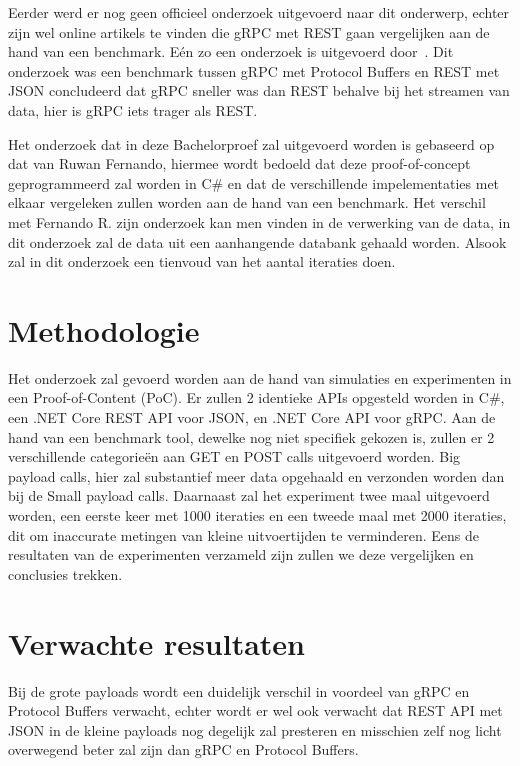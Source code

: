 Eerder werd er nog geen officieel onderzoek uitgevoerd naar dit onderwerp, echter zijn wel online artikels te vinden die gRPC met REST gaan vergelijken aan de hand van een benchmark. Eén zo een onderzoek is uitgevoerd door~\textcite{Fernando2019}. Dit onderzoek was een benchmark tussen gRPC met Protocol Buffers en REST met JSON concludeerd dat gRPC sneller was dan REST behalve bij het streamen van data, hier is gRPC iets trager als REST.

Het onderzoek dat in deze Bachelorproef zal uitgevoerd worden is gebaseerd op dat van Ruwan Fernando, hiermee wordt bedoeld dat deze proof-of-concept geprogrammeerd zal worden in C\# en dat de  verschillende impelementaties met elkaar vergeleken zullen worden aan de hand van een benchmark. Het verschil met Fernando R. zijn onderzoek kan men vinden in de verwerking van de data, in dit onderzoek zal de data uit een aanhangende databank gehaald worden. Alsook zal in dit onderzoek een tienvoud van het aantal iteraties doen.


\section{Methodologie}
\label{sec:methodologie}
Het onderzoek zal gevoerd worden aan de hand van simulaties en experimenten in een Proof-of-Content (PoC). Er zullen 2 identieke APIs opgesteld worden in C\#, een .NET Core REST API voor JSON, en .NET Core API voor gRPC. Aan de hand van een benchmark tool, dewelke nog niet specifiek gekozen is, zullen er 2 verschillende categorieën aan GET en POST calls uitgevoerd worden. Big payload calls, hier zal substantief meer data opgehaald en verzonden worden dan bij de Small payload calls. Daarnaast zal het experiment twee maal uitgevoerd worden, een eerste keer met 1000 iteraties en een tweede maal met 2000 iteraties, dit om inaccurate metingen van kleine uitvoertijden te verminderen.
Eens de resultaten van de experimenten verzameld zijn zullen we deze vergelijken en conclusies trekken.
\section{Verwachte resultaten}
\label{sec:verwachte_resultaten}
Bij de grote payloads wordt een duidelijk verschil in voordeel van gRPC en Protocol Buffers verwacht, echter wordt er wel ook verwacht dat REST API met JSON in de kleine payloads nog degelijk zal presteren en misschien zelf nog licht overwegend beter zal zijn dan gRPC en Protocol Buffers.


